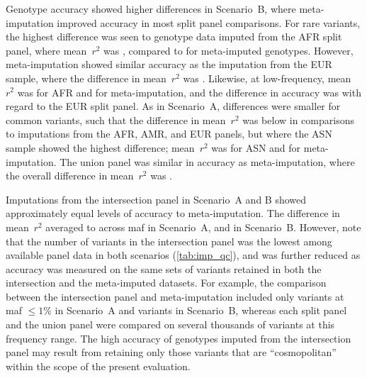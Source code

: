 %

%

Genotype accuracy showed higher differences in Scenario~B, where meta-imputation improved accuracy in most split panel comparisons.
For rare variants, the highest difference was seen to genotype data imputed from the AFR split panel, where mean~$r^2$ was , compared to  for meta-imputed genotypes.
However, meta-imputation showed similar accuracy as the imputation from the EUR sample, where the difference in mean~$r^2$ was .
Likewise, at low-frequency, mean~$r^2$ was  for AFR and  for meta-imputation, and the difference in accuracy was  with regard to the EUR split panel.
As in Scenario~A, differences were smaller for common variants, such that the difference in mean~$r^2$ was below  in comparisons to imputations from the AFR, AMR, and EUR panels, but where the ASN sample showed the highest difference; mean~$r^2$ was  for ASN and  for meta-imputation.
The union panel was similar in accuracy as meta-imputation, where the overall difference in mean~$r^2$ was .

Imputations from the intersection panel in Scenario~A and B showed approximately equal levels of accuracy to meta-imputation.
The difference in mean~$r^2$ averaged to  across \gls{maf} in Scenario~A, and  in Scenario~B.
However, note that the number of variants in the intersection panel was the lowest among available panel data in both scenarios (\cref{tab:imp_qc}), and was further reduced as accuracy was measured on the same sets of variants retained in both the intersection and the meta-imputed datasets.
For example, the comparison between the intersection panel and meta-imputation included only  variants at \gls{maf} ${\leq 1\%}$ in Scenario~A and  variants in Scenario~B, whereas each split panel and the union panel were compared on several thousands of variants at this frequency range.
The high accuracy of genotypes imputed from the intersection panel may result from retaining only those variants that are ``cosmopolitan'' within the scope of the present evaluation.


%

%


